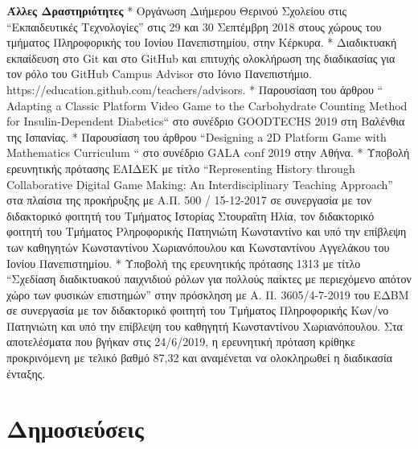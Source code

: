 \documentclass[%
    11pt,
  oneside
  ]{memoir}
\let\oldsection\section
\renewcommand{\section}[1]{%
  \oldsection{#1}
  \leavevmode
  \par
  \vspace{\dimexpr-\baselineskip-\parskip}
}
\begin{document}
\textbf{Άλλες Δραστηριότητες} * Οργάνωση Διήμερου Θερινού Σχολείου στις
``Εκπαιδευτικές Τεχνολογίες'' στις 29 και 30 Σεπτέμβρη 2018 στους χώρους
του τμήματος Πληροφορικής του Ιονίου Πανεπιστημίου, στην Κέρκυρα. *
Διαδικτυακή εκπαίδευση στο Git και στο GitHub και επιτυχής ολοκλήρωση
της διαδικασίας για τον ρόλο του GitHub Campus Advisor στο Ιόνιο
Πανεπιστήμιο. https://education.github.com/teachers/advisors. *
Παρουσίαση του άρθρου `` Adapting a Classic Platform Video Game to the
Carbohydrate Counting Method for Insulin-Dependent Diabetics`` στο
συνέδριο GOODTECHS 2019 στη Βαλένθια της Ισπανίας. * Παρουσίαση του
άρθρου ``Designing a 2D Platform Game with Mathematics Curriculum `` στο
συνέδριο GALA conf 2019 στην Αθήνα. * Υποβολή ερευνητικής πρότασης
ΕΛΙΔΕΚ με τίτλο ``Representing History through Collaborative Digital
Game Making: An Interdisciplinary Teaching Approach'' στα πλαίσια της
προκήρυξης με Α.Π. 500 / 15-12-2017 σε συνεργασία με τον διδακτορικό
φοιτητή του Tμήματος Ιστορίας Στουραΐτη Ηλία, τον διδακτορικό φοιτητή
του Tμήματος Pληροφορικής Πατηνιώτη Κωνσταντίνο και υπό την επίβλεψη των
καθηγητών Κωνσταντίνου Χωριανόπουλου και Κωνσταντίνου Αγγελάκου του
Ιονίου Πανεπιστημίου. * Υποβολή της ερευνητικής πρότασης 1313 με τίτλο
``Σχεδίαση διαδικτυακού παιχνιδιού ρόλων για πολλούς παίκτες με
περιεχόμενο απότον χώρο των φυσικών επιστημών'' στην πρόσκληση με Α. Π.
3605/4-7-2019 του ΕΔΒΜ σε συνεργασία με τον διδακτορικό φοιτητή του
Τμήματος Πληροφορικής Κων/νο Πατηνιώτη και υπό την επίβλεψη του καθηγητή
Κωνσταντίνου Χωριανόπουλου. Στα αποτελέσματα που βγήκαν στις 24/6/2019,
η ερευνητική πρόταση κρίθηκε προκρινόμενη με τελικό βαθμό 87,32 και
αναμένεται να ολοκληρωθεί η διαδικασία ένταξης.

\hypertarget{ux3b4ux3b7ux3bcux3bfux3c3ux3b9ux3b5ux3cdux3c3ux3b5ux3b9ux3c2}{%
\section{Δημοσιεύσεις}\label{ux3b4ux3b7ux3bcux3bfux3c3ux3b9ux3b5ux3cdux3c3ux3b5ux3b9ux3c2}}
\end{document}
